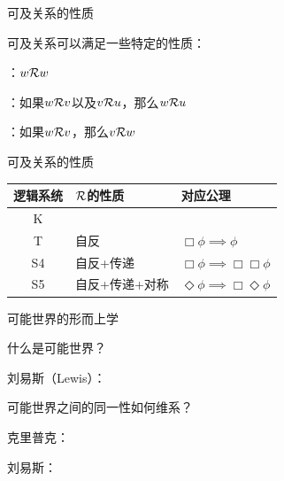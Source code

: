 \documentclass{zhslides}
\begin{document}
\begin{frame}{可及关系的性质}
  
  可及关系可以满足一些特定的性质：
  
  \bit
    \item {}：$w\mathcal{R}w$
    \item {}：如果$w\mathcal{R}v$以及$v\mathcal{R}u$，那么$w\mathcal{R}u$
    \item {}：如果$w\mathcal{R}v$，那么$v\mathcal{R}w$
  \eit
    
\end{frame}


\begin{frame}{可及关系的性质}
  
  \begin{table}[h]
  \centering
  {\renewcommand{\arraystretch}{1.2}
  \begin{tabular}{cll}
    \textbf{逻辑系统} & \textbf{$\mathcal{\boldsymbol{R}}$的性质} & \textbf{对应公理} \\\hline
    K &  &  \\\pause
    T & 自反 & $\Box\phi \implies \phi$ \\\pause
    S4 & 自反+传递 & $\Box\phi \implies \Box\Box\phi$ \\\pause
    S5 & 自反+传递+对称 & $\Diamond\phi \implies \Box\Diamond\phi$ \\
  \end{tabular}
  }
  \end{table}
  
\end{frame}


\begin{frame}{可能世界的形而上学}
  
  什么是可能世界？
  
  \bit
    \item 刘易斯（Lewis）：
    \item {}
  \eit
  \pause
  
  可能世界之间的同一性如何维系？
  
  \bit
    \item 克里普克：
    \item 刘易斯：
  \eit
  
\end{frame}
\end{document}
